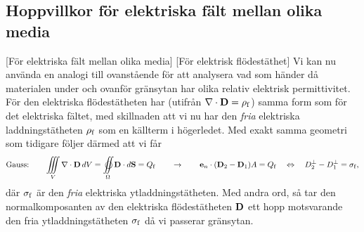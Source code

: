 {\subsection{Hoppvillkor f{\"o}r elektriska f{\"a}lt mellan olika media}
[F{\"o}r elektriska f{\"a}lt mellan olika media]
[F{\"o}r elektrisk fl{\"o}dest{\"a}thet]
Vi kan nu anv{\"a}nda en analogi till ovanst{\aa}ende f{\"o}r att analysera vad
som h{\"a}nder d{\aa} materialen under och ovanf{\"o}r gr{\"a}nsytan har olika
relativ elektrisk permittivitet. 
F{\"o}r den elektriska fl{\"o}dest{\"a}theten har  (utifr{\aa}n
$\nabla\cdot{\bf D}=\rho_{\rm f}$) samma form som f{\"o}r det elektriska
f{\"a}ltet, med skillnaden att vi nu har den {\it fria} elektriska
laddningst{\"a}theten $\rho_{\rm f}$ som en k{\"a}llterm i h{\"o}gerledet.
Med exakt samma geometri som tidigare f{\"o}ljer d{\"a}rmed att vi
f{\aa}r
$$
  \hbox{Gauss:}\qquad
  \displaystyle
  \iiint_V\nabla\cdot{\bf D}\,dV=
  \oiint_{\Omega}{\bf D}\cdot d{\bf S} = Q_{\rm f}
  \qquad\to\qquad
  {\bf e}_n \cdot({\bf D}_{2}-{\bf D}_{1})A = Q_{\rm f}
  \quad\Leftrightarrow\quad
  D^{\perp}_{2}-D^{\perp}_{1} = \sigma_{\rm f},
$$
d{\"a}r $\sigma_{\rm f}$ {\"a}r den {\it fria} elektriska
ytladdningst{\"a}theten. Med andra ord, s{\aa} tar den normalkomposanten av
den elektriska fl{\"o}dest{\"a}theten ${\bf D}$ ett hopp motsvarande den fria
ytladdningst{\"a}theten $\sigma_{\rm f}$ d{\aa} vi passerar gr{\"a}nsytan.

}
